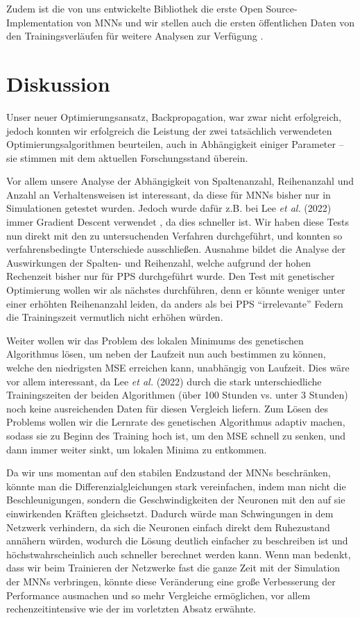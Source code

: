 \documentclass[10pt]{scrartcl}
\newcommand{\lee}{Lee {\itshape et al.} (2022)}
\begin{document}
Zudem ist die von uns entwickelte Bibliothek die erste Open Source-Implementation von MNNs und wir stellen auch die ersten öffentlichen Daten von den Trainingsverläufen für weitere Analysen zur Verfügung \cite{RepoMNN}.

\section{Diskussion}

Unser neuer Optimierungsansatz, Backpropagation, war zwar nicht erfolgreich, jedoch konnten wir erfolgreich die Leistung der zwei tatsächlich verwendeten Optimierungsalgorithmen beurteilen, auch in Abhängigkeit einiger Parameter -- sie stimmen mit dem aktuellen Forschungsstand überein.

Vor allem unsere Analyse der Abhängigkeit von Spaltenanzahl, Reihenanzahl und Anzahl an Verhaltensweisen ist interessant, da diese für MNNs bisher nur in Simulationen getestet wurden.
Jedoch wurde dafür z.B. bei \lee{} immer Gradient Descent verwendet \cite[6]{Lee2022Sup}, da dies schneller ist.
Wir haben diese Tests nun direkt mit den zu untersuchenden Verfahren durchgeführt, und konnten so verfahrensbedingte Unterschiede ausschließen.
Ausnahme bildet die Analyse der Auswirkungen der Spalten- und Reihenzahl, welche aufgrund der hohen Rechenzeit bisher nur für PPS durchgeführt wurde.
Den Test mit genetischer Optimierung wollen wir als nächstes durchführen, denn er könnte weniger unter einer erhöhten Reihenanzahl leiden, da anders als bei PPS \enquote{irrelevante} Federn die Trainingszeit vermutlich nicht erhöhen würden.

Weiter wollen wir das Problem des lokalen Minimums des genetischen Algorithmus lösen, um neben der Laufzeit nun auch bestimmen zu können, welche den niedrigsten MSE erreichen kann, unabhängig von Laufzeit.
Dies wäre vor allem interessant, da \lee{} durch die stark unterschiedliche Trainingszeiten der beiden Algorithmen (über 100 Stunden vs. unter 3 Stunden) noch keine ausreichenden Daten für diesen Vergleich liefern. Zum Lösen des Problems wollen wir die Lernrate des genetischen Algorithmus adaptiv machen, sodass sie zu Beginn des Training hoch ist, um den MSE schnell zu senken, und dann immer weiter sinkt, um lokalen Minima zu entkommen.

Da wir uns momentan auf den stabilen Endzustand der MNNs beschränken, könnte man die Differenzialgleichungen stark vereinfachen, indem man nicht die Beschleunigungen, sondern die Geschwindigkeiten der Neuronen mit den auf sie einwirkenden Kräften gleichsetzt.
Dadurch würde man Schwingungen in dem Netzwerk verhindern, da sich die Neuronen einfach direkt dem Ruhezustand annähern würden, wodurch die Lösung deutlich einfacher zu beschreiben ist und höchstwahrscheinlich auch schneller berechnet werden kann. 
Wenn man bedenkt, dass wir beim Trainieren der Netzwerke fast die ganze Zeit mit der Simulation der MNNs verbringen, könnte diese Veränderung eine große Verbesserung der Performance ausmachen und so mehr Vergleiche ermöglichen, vor allem rechenzeitintensive wie der im vorletzten Absatz erwähnte.
\end{document}
